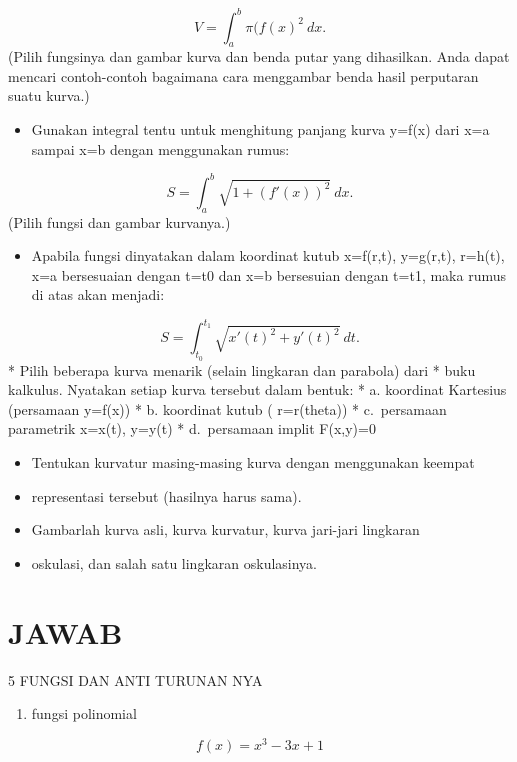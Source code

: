 \documentclass[
]{book}
\providecommand{\tightlist}{%
  \setlength{\itemsep}{0pt}\setlength{\parskip}{0pt}}
\begin{document}
\[V = \int_a^b \pi (f(x)^2\ dx.\](Pilih fungsinya dan gambar kurva dan benda putar yang dihasilkan. Anda dapat mencari contoh-contoh bagaimana cara menggambar benda hasil perputaran suatu kurva.)

\begin{itemize}
\tightlist
\item
  Gunakan integral tentu untuk menghitung panjang kurva y=f(x) dari x=a sampai x=b dengan menggunakan rumus:
\end{itemize}

\[S = \int_a^b \sqrt{1+(f'(x))^2} \ dx.\](Pilih fungsi dan gambar kurvanya.)

\begin{itemize}
\tightlist
\item
  Apabila fungsi dinyatakan dalam koordinat kutub x=f(r,t), y=g(r,t), r=h(t), x=a bersesuaian dengan t=t0 dan x=b bersesuian dengan t=t1, maka rumus di atas akan menjadi:
\end{itemize}

\[S=\int_{t_0}^{t_1} \sqrt{x'(t)^2+y'(t)^2}\ dt.\]* Pilih beberapa kurva menarik (selain lingkaran dan parabola) dari * buku kalkulus. Nyatakan setiap kurva tersebut dalam bentuk: * a. koordinat Kartesius (persamaan y=f(x)) * b. koordinat kutub ( r=r(theta)) * c.~persamaan parametrik x=x(t), y=y(t) * d.~persamaan implit F(x,y)=0

\begin{itemize}
\item
  Tentukan kurvatur masing-masing kurva dengan menggunakan keempat
\item
  representasi tersebut (hasilnya harus sama).
\item
  Gambarlah kurva asli, kurva kurvatur, kurva jari-jari lingkaran
\item
  oskulasi, dan salah satu lingkaran oskulasinya.
\end{itemize}

\chapter{JAWAB}\label{jawab}

5 FUNGSI DAN ANTI TURUNAN NYA

\begin{enumerate}
\def\labelenumi{\arabic{enumi}.}
\tightlist
\item
  fungsi polinomial
\end{enumerate}

\[f(x)=x^3-3x+1\]
\end{document}

